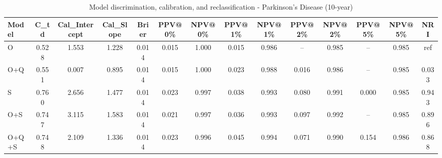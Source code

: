 \begin{table}[htbp]
\centering
\small
\caption{Model discrimination, calibration, and reclassification - Parkinson's Disease (10-year)}
\label{tab:perf_pd_10y}
\begin{tabular}{lccccccccccccc}
\toprule
Model & C\_td & Cal\_Intercept & Cal\_Slope & Brier & PPV@0\% & NPV@0\% & PPV@1\% & NPV@1\% & PPV@2\% & NPV@2\% & PPV@5\% & NPV@5\% & NRI \\
\midrule
O & 0.528 & 1.553 & 1.228 & 0.014 & 0.015 & 1.000 & 0.015 & 0.986 & -- & 0.985 & -- & 0.985 & ref \\
O+Q & 0.551 & 0.007 & 0.895 & 0.014 & 0.015 & 1.000 & 0.023 & 0.988 & 0.016 & 0.986 & -- & 0.985 & 0.033 \\
S & 0.760 & 2.656 & 1.477 & 0.014 & 0.023 & 0.997 & 0.038 & 0.993 & 0.080 & 0.991 & 0.000 & 0.985 & 0.943 \\
O+S & 0.747 & 3.115 & 1.583 & 0.014 & 0.021 & 0.997 & 0.036 & 0.993 & 0.097 & 0.992 & -- & 0.985 & 0.896 \\
O+Q+S & 0.748 & 2.109 & 1.336 & 0.014 & 0.023 & 0.996 & 0.045 & 0.994 & 0.071 & 0.990 & 0.154 & 0.986 & 0.868 \\
\bottomrule
\end{tabular}
\end{table}